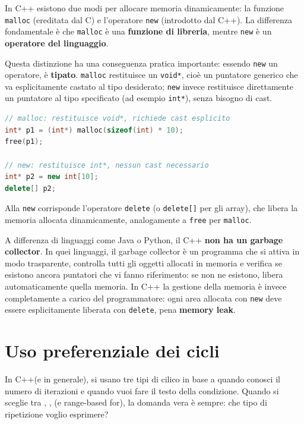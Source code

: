 \begin{codeexample}
In C++ esistono due modi per allocare memoria dinamicamente: la funzione
\texttt{malloc} (ereditata dal C) e l'operatore \texttt{new} (introdotto dal C++).
La differenza fondamentale è che \texttt{malloc} è una \textbf{funzione di libreria},
mentre \texttt{new} è un \textbf{operatore del linguaggio}.

Questa distinzione ha una conseguenza pratica importante: essendo \texttt{new} un
operatore, è \textbf{tipato}. \texttt{malloc} restituisce un \texttt{void*}, cioè un
puntatore generico che va esplicitamente castato al tipo desiderato; \texttt{new}
invece restituisce direttamente un puntatore al tipo specificato (ad esempio
\texttt{int*}), senza bisogno di cast.

\begin{codebox}
\begin{lstlisting}[language=C++]
// malloc: restituisce void*, richiede cast esplicito
int* p1 = (int*) malloc(sizeof(int) * 10);
free(p1);

// new: restituisce int*, nessun cast necessario
int* p2 = new int[10];
delete[] p2;
\end{lstlisting}
\end{codebox}

Alla \texttt{new} corrisponde l'operatore \texttt{delete} (o \texttt{delete[]} per
gli array), che libera la memoria allocata dinamicamente, analogamente a
\texttt{free} per \texttt{malloc}.

A differenza di linguaggi come Java o Python, il C++ \textbf{non ha un garbage
collector}. In quei linguaggi, il garbage collector è un programma che si attiva in
modo trasparente, controlla tutti gli oggetti allocati in memoria e verifica se
esistono ancora puntatori che vi fanno riferimento: se non ne esistono, libera
automaticamente quella memoria. In C++ la gestione della memoria è invece
completamente a carico del programmatore: ogni area allocata con \texttt{new} deve
essere esplicitamente liberata con \texttt{delete}, pena \textbf{memory leak}.
\end{codeexample}

\section{Uso preferenziale dei cicli }

In C++(e in generale), si usano tre tipi di cilico in base a quando conosci il numero di iterazioni e quando vuoi fare il testo della condizione.  Quando si  sceglie tra , , (e range-based for), la domanda vera è sempre: che tipo di ripetizione voglio esprimere?


